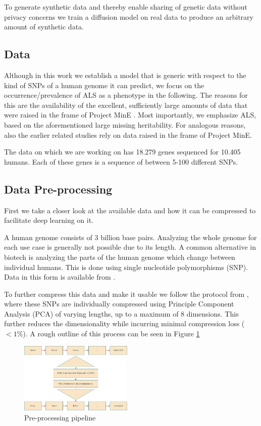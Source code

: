 

To generate synthetic data and thereby enable sharing of genetic data without privacy concerns we train a diffusion model on real data to produce an arbitrary amount of synthetic data.
\subsection{Data}

Although in this work we establish a model that is generic with respect to the kind of SNPs of a human genome it can predict, we focus on the occurrence/prevalence of ALS as a phenotype in the following. The reasons for this are the availability of the excellent, sufficiently large amounts of data that were raised in the frame of Project MinE \citet{project2018project}. Most importantly, we emphasize ALS, based on the aforementioned large missing heritability. For analogous reasons, also the earlier related studies \citep{auer2012imputation, dolzhenko2017detection} rely on data raised in the frame of Project MinE. 


The data on which we are working on has 18.279 genes sequenced for 10.405 humans. Each of these genes is a sequence of between 5-100 different SNPs.


\subsection{Data Pre-processing}
First we take a closer look at the available data and how it can be compressed to facilitate deep learning on it.%

A human genome consists of 3 billion base pairs. Analyzing the whole genome for each use case is generally not possible due to its length.
A common alternative in biotech is analyzing the parts of the human genome which change between individual humans. This is done using single nucleotide polymorphisms (SNP). Data in this form is available from \cite{project2018project}.

To further compress this data and make it usable we follow the protocol from \citet{capsulenet}, where these SNPs are individually compressed using Principle Component Analysis (PCA) of varying lengths, up to a maximum of 8 dimensions. This further reduces the dimensionality while incurring minimal compression loss ($<1\%$). A rough outline of this process can be seen in Figure \ref{fig:pca}

\begin{figure}
    \centering
    
    \includegraphics[width = 0.48\textwidth]{figures/preprocess.jpg}
    \caption{Pre-processing pipeline}
    \label{fig:pca}
\end{figure}

